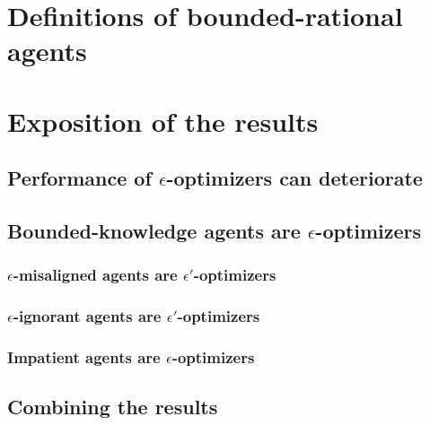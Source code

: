 \documentclass{article} %
\theoremstyle{remark}
\begin{document}
\section{Definitions of bounded-rational agents}\label{sec:def_bounded_rat}



\section{Exposition of the results}

\subsection{Performance of \texorpdfstring{$\epsilon$}{epsilon}-optimizers can deteriorate} \label{sec:policy_mod}


\subsection{Bounded-knowledge agents are \texorpdfstring{$\epsilon$}{epsilon}-optimizers} \label{sec:optimization_bounds}


\subsubsection{\texorpdfstring{$\epsilon$}{epsilon}-misaligned agents are \texorpdfstring{$\epsilon'$}{epsilon'}-optimizers}\label{sec:utility}


\subsubsection{\texorpdfstring{$\epsilon$}{epsilon}-ignorant agents are \texorpdfstring{$\epsilon'$}{epsilon'}-optimizers} \label{sec:belief}


\subsubsection{Impatient agents are \texorpdfstring{$\epsilon$}{epsilon}-optimizers} \label{sec:gammas}


\subsection{Combining the results} \label{sec:combining}

\end{document}
